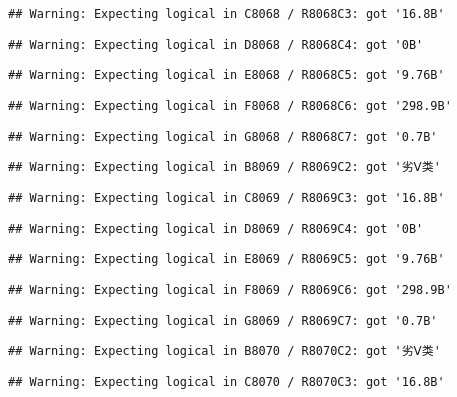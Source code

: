 \documentclass[
]{article}
\begin{document}
\begin{verbatim}
## Warning: Expecting logical in C8068 / R8068C3: got '16.8B'
\end{verbatim}

\begin{verbatim}
## Warning: Expecting logical in D8068 / R8068C4: got '0B'
\end{verbatim}

\begin{verbatim}
## Warning: Expecting logical in E8068 / R8068C5: got '9.76B'
\end{verbatim}

\begin{verbatim}
## Warning: Expecting logical in F8068 / R8068C6: got '298.9B'
\end{verbatim}

\begin{verbatim}
## Warning: Expecting logical in G8068 / R8068C7: got '0.7B'
\end{verbatim}

\begin{verbatim}
## Warning: Expecting logical in B8069 / R8069C2: got '劣Ⅴ类'
\end{verbatim}

\begin{verbatim}
## Warning: Expecting logical in C8069 / R8069C3: got '16.8B'
\end{verbatim}

\begin{verbatim}
## Warning: Expecting logical in D8069 / R8069C4: got '0B'
\end{verbatim}

\begin{verbatim}
## Warning: Expecting logical in E8069 / R8069C5: got '9.76B'
\end{verbatim}

\begin{verbatim}
## Warning: Expecting logical in F8069 / R8069C6: got '298.9B'
\end{verbatim}

\begin{verbatim}
## Warning: Expecting logical in G8069 / R8069C7: got '0.7B'
\end{verbatim}

\begin{verbatim}
## Warning: Expecting logical in B8070 / R8070C2: got '劣Ⅴ类'
\end{verbatim}

\begin{verbatim}
## Warning: Expecting logical in C8070 / R8070C3: got '16.8B'
\end{verbatim}
\end{document}
